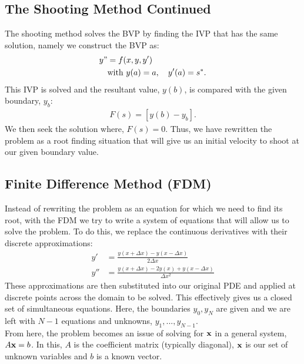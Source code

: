 \documentclass[11pt,a4paper]{report}
\begin{document}
	\subsection{The Shooting Method Continued}
	The shooting method solves the BVP by finding the IVP that has the same solution, namely we construct the BVP as:
	\begin{align}
		y" &= f(x,y,y')\\
		   &\text{with } y(a)=a,\quad y'(a)=s^*.
	\end{align}
	This IVP is solved and the resultant value, $y(b)$, is compared with the given boundary, $y_b$:
	\begin{align}
		F(s) = [y(b) - y_b]. \label{wk8:shoot}
	\end{align}
	We then seek the solution where, $F(s)=0$. Thus, we have rewritten the problem as a root finding situation that will give us an initial velocity to shoot at our given boundary value.
	
	\subsection{Finite Difference Method (FDM)}
	Instead of rewriting the problem as an equation for which we need to find its root, with the FDM we try to write a system of equations that will allow us to solve the problem. To do this, we replace the continuous derivatives with their discrete approximations:
	\begin{align}
		y' &= \frac{y(x+\Delta x) - y(x-\Delta x)}{2\Delta x} \\
		y''&= \frac{y(x+\Delta x) - 2y(x) + y(x-\Delta x)}{\Delta x^2}
	\end{align}
	These approximations are then substituted into our original PDE and applied at discrete points across the domain to be solved. This effectively gives us a closed set of simultaneous equations. Here, the boundaries $y_0,y_N$ are given and we are left with $N-1$ equations and unknowns, $y_1,...,y_{N-1}$. \\
	
	From here, the problem becomes an issue of solving for $\mathbf{x}$ in a general system, $A\mathbf{x} = b$. In this, $A$ is the coefficient matrix (typically diagonal), $\mathbf{x}$ is our set of unknown variables and $b$ is a known vector.
	
\end{document}
